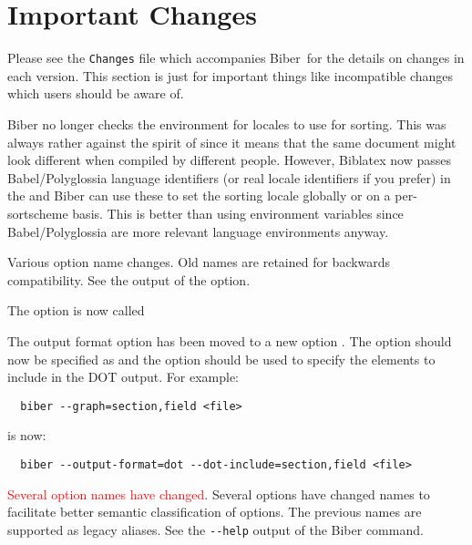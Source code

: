\documentclass{ltxdockit}
\newcommand*{\biber}{Biber\xspace}
\newcommand*{\biblatex}{Biblatex\xspace}
\begin{document}
\printtitlepage
\tableofcontents

\section{Important Changes}\label{special}

Please see the \verb+Changes+ file which accompanies \biber\ for the
details on changes in each version. This section is just for important
things like incompatible changes which users should be aware of.

\biber no longer checks the environment for locales to use for sorting. This
was always rather against the spirit of \tex since it means that the same
document might look different when compiled by different people. However,
\biblatex now passes Babel/Polyglossia language identifiers (or real locale
identifiers if you prefer) in the  and \biber can use these to
set the sorting locale globally or on a per-sortscheme basis. This is better
than using environment variables since Babel/Polyglossia are more \latex
relevant language environments anyway.

Various option name changes. Old names are retained for backwards
compatibility. See the output of the  option.

The  option is now called 

The output format option  has been moved to a
new option . The option  should now be
specified as  and the \linebreak{} option
should be used to specify the elements to include in the DOT output. For
example:

\begin{verbatim}
  biber --graph=section,field <file>
\end{verbatim}

\noindent is now:

\begin{verbatim}
  biber --output-format=dot --dot-include=section,field <file>
\end{verbatim}

\textcolor{red}{Several option names have changed}. Several options have
changed names to facilitate better semantic classification of options. The
previous names are supported as legacy aliases. See the \verb+--help+
output of the \biber command.
\end{document}
